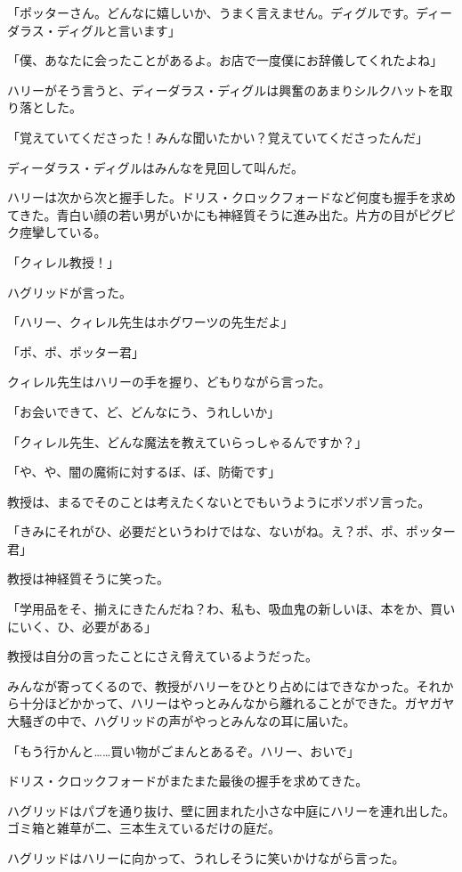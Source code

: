 \documentclass[10pt,a4paper]{article}
\begin{document}
\begin{CJK}{UTF8}{min}
「ポッターさん。どんなに嬉しいか、うまく言えません。ディグルです。ディーダラス・ディグルと言います」

「僕、あなたに会ったことがあるよ。お店で一度僕にお辞儀してくれたよね」

ハリーがそう言うと、ディーダラス・ディグルは興奮のあまりシルクハットを取り落とした。

「覚えていてくださった！みんな聞いたかい？覚えていてくださったんだ」

ディーダラス・ディグルはみんなを見回して叫んだ。

ハリーは次から次と握手した。ドリス・クロックフォードなど何度も握手を求めてきた。青白い顔の若い男がいかにも神経質そうに進み出た。片方の目がピグピク痙攣している。

「クィレル教授！」

ハグリッドが言った。

「ハリー、クィレル先生はホグワーツの先生だよ」

「ポ、ポ、ポッター君」

クィレル先生はハリーの手を握り、どもりながら言った。

「お会いできて、ど、どんなにう、うれしいか」

「クィレル先生、どんな魔法を教えていらっしゃるんですか？」

「や、や、闇の魔術に対するぼ、ぼ、防衛です」

教授は、まるでそのことは考えたくないとでもいうようにボソボソ言った。

「きみにそれがひ、必要だというわけではな、ないがね。え？ポ、ポ、ポッター君」

教授は神経質そうに笑った。

「学用品をそ、揃えにきたんだね？わ、私も、吸血鬼の新しいほ、本をか、買いにいく、ひ、必要がある」

教授は自分の言ったことにさえ脅えているようだった。

みんなが寄ってくるので、教授がハリーをひとり占めにはできなかった。それから十分ほどかかって、ハリーはやっとみんなから離れることができた。ガヤガヤ大騒ぎの中で、ハグリッドの声がやっとみんなの耳に届いた。

「もう行かんと……買い物がごまんとあるぞ。ハリー、おいで」

ドリス・クロックフォードがまたまた最後の握手を求めてきた。

ハグリッドはパブを通り抜け、壁に囲まれた小さな中庭にハリーを連れ出した。ゴミ箱と雑草が二、三本生えているだけの庭だ。

ハグリッドはハリーに向かって、うれしそうに笑いかけながら言った。


\end{CJK}
\end{document}
